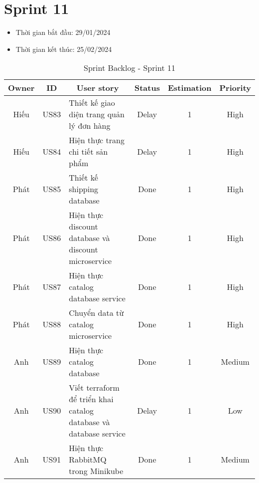 \section{Sprint 11}
\begin{itemize}
    \item Thời gian bắt đầu: 29/01/2024
    \item Thời gian kết thúc: 25/02/2024
\end{itemize}
\begin{table}[H]
    \begin{tabular}{|c|c|m{6cm}|c|c|c|}
    \hline
    \textbf{Owner} & \textbf{ID} & \multicolumn{1}{c|}{\textbf{User story}}                                & \textbf{Status} & \textbf{Estimation} & \textbf{Priority} \\ \hline
    Hiếu         & US83        & Thiết kế giao diện trang quản lý đơn hàng                    & Delay            & 1                   & High         \\ \hline
    Hiếu        & US84        & Hiện thực trang chi tiết sản phẩm                     & Delay            & 1                   & High         \\ \hline
    Phát         & US85        & Thiết kế shipping database                    & Done            & 1                   & High         \\ \hline
    Phát        & US86        & Hiện thực discount database và discount microservice                  & Done            & 1                   & High         \\ \hline
    Phát        & US87        & Hiện thực catalog database service                   & Done            & 1                   & High         \\ \hline
    Phát        & US88        & Chuyển data từ catalog microservice                   & Done            & 1                   & High         \\ \hline
    Anh        & US89        & Hiện thực catalog database                   & Done            & 1                   & Medium         \\ \hline
    Anh        & US90        & Viết terraform để triển khai catalog database và database service                   & Delay            & 1                   & Low         \\ \hline
    Anh        & US91        & Hiện thực RabbitMQ trong Minikube                   & Done            & 1                   & Medium         \\ \hline
    \end{tabular}
    \caption{Sprint Backlog - Sprint 11}
    \label{tab:sprint-11}
\end{table}
